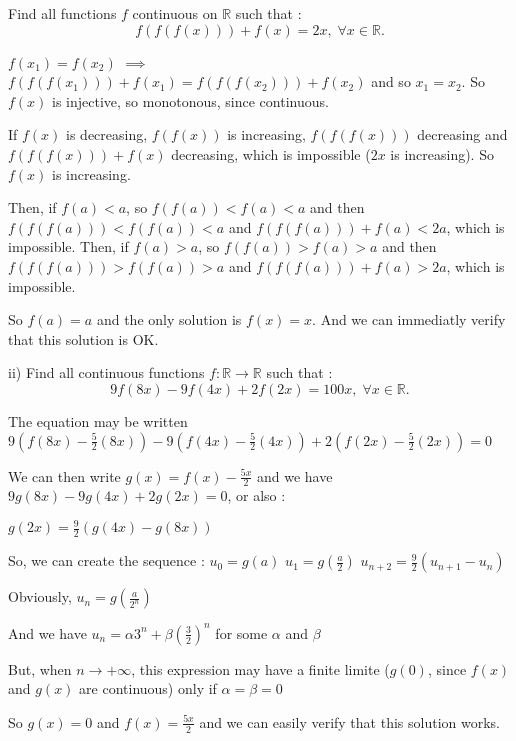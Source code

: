 \begin{solution}
	\begin{tcolorbox}  Find all functions $ f$ continuous on $ \mathbb{R}$ such that :
\[ f ( f ( f (x))) + f (x) = 2x, \;\forall x \in \mathbb{R}.
\]\end{tcolorbox}

$ f(x_1)=f(x_2)$ $ \implies$ $ f(f(f(x_1)))+f(x_1)=f(f(f(x_2)))+f(x_2)$ and so $ x_1=x_2$.  So $ f(x)$ is injective, so monotonous, since continuous.

If $ f(x)$ is decreasing, $ f(f(x))$ is increasing, $ f(f(f(x)))$ decreasing and $ f(f(f(x)))+f(x)$ decreasing, which is impossible ($ 2x$ is increasing). So $ f(x)$ is increasing.

Then, if $ f(a)<a$, so $ f(f(a))<f(a)<a$ and then $ f(f(f(a)))<f(f(a))<a$ and $ f(f(f(a)))+f(a)<2a$, which is impossible.
Then, if $ f(a)>a$, so $ f(f(a))>f(a)>a$ and then $ f(f(f(a)))>f(f(a))>a$ and $ f(f(f(a)))+f(a)>2a$, which is impossible.

So $ f(a)=a$ and the only solution is $ f(x)=x$. And we can immediatly verify that this solution is OK.
\end{solution}



\begin{solution}
	\begin{tcolorbox} ii) Find all continuous functions $ f : \mathbb{R} \to \mathbb{R}$ such that :
\[ 9 f (8x) - 9 f (4x) + 2 f (2x) = 100x, \;\forall x \in \mathbb{R}.
\]\end{tcolorbox}

The equation may be written $ 9(f(8x)-\frac{5}{2}(8x))-9(f(4x)-\frac{5}{2}(4x))+2(f(2x)-\frac{5}{2}(2x))=0$

We can then write $ g(x)=f(x)-\frac{5x}{2}$ and we have $ 9g(8x)-9g(4x)+2g(2x)=0$, or also :

$ g(2x)=\frac{9}{2}(g(4x)-g(8x))$

So, we can create the sequence :
$ u_0=g(a)$
$ u_1=g(\frac{a}{2})$
$ u_{n+2}=\frac{9}{2}(u_{n+1}-u_n)$

Obviously, $ u_n=g(\frac{a}{2^n})$

And we have $ u_n=\alpha 3^n + \beta (\frac{3}{2})^n$ for some $ \alpha$ and $ \beta$

But, when $ n\longrightarrow +\infty$, this expression may have a finite limite ($ g(0)$, since $ f(x)$ and $ g(x)$ are continuous) only if $ \alpha=\beta=0$

So $ g(x)=0$ and $ f(x)=\frac{5x}{2}$ and we can easily verify that this solution works.
\end{solution}



